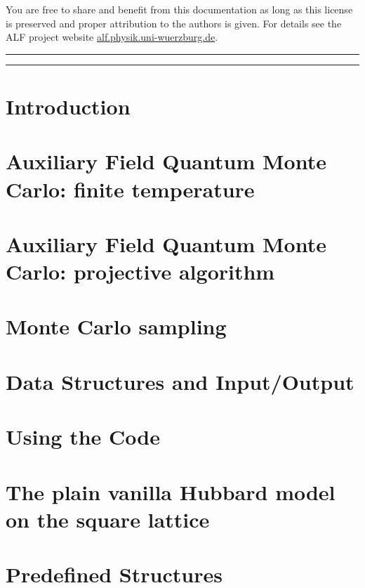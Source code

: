 \documentclass[submission, Phys]{SciPost}
\begin{document}
You are free to share and benefit from this documentation as long as this license is preserved
and proper attribution to the authors is given. For details see the ALF project
website \url{alf.physik.uni-wuerzburg.de}.

\vspace{10pt}
\noindent\rule{\textwidth}{1pt}
\tableofcontents\thispagestyle{fancy}
\noindent\rule{\textwidth}{1pt}
\vspace{10pt}

\section{Introduction}\label{sec:intro}

\section{Auxiliary Field Quantum Monte Carlo: finite temperature}\label{sec:def}




\section{Auxiliary Field Quantum Monte Carlo: projective algorithm}\label{sec:defT0}

\section{Monte Carlo sampling}\label{sec:sampling}


\section{Data Structures and Input/Output}\label{sec:imp}


\section{Using the Code}\label{sec:running}

\section{The plain vanilla Hubbard model on the square lattice} \label{sec:vanilla}

\section{Predefined Structures}\label{sec:predefined}


\end{document}
